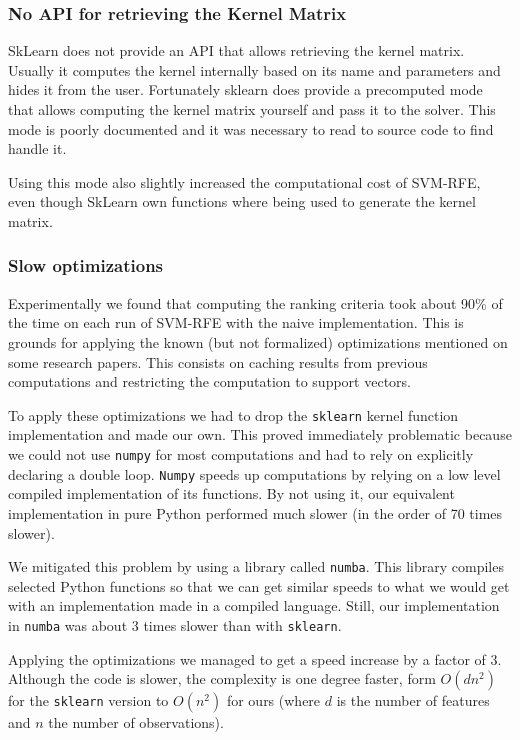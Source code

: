 \subsubsection*{No API for retrieving the Kernel Matrix}
SkLearn does not provide an API that allows retrieving the kernel matrix. Usually it computes the kernel internally based on its name and parameters and hides it from the user. Fortunately sklearn does provide a precomputed mode that allows computing the kernel matrix yourself and pass it to the solver. This mode is poorly documented and it was necessary to read to source code to find handle it.

Using this mode also slightly increased the computational cost of SVM-RFE, even though SkLearn own functions where being used to generate the kernel matrix.

\subsubsection*{Slow optimizations}
Experimentally we found that computing the ranking criteria took about 90\% of the time on each run of SVM-RFE with the naive implement\-ation. This is grounds for applying the known (but not formalized) optimizations mentioned on some research papers. This consists on caching results from previous computations and restricting the comput\-ation to support vectors.

To apply these optimizations we had to drop the \texttt{sklearn} kernel function im\-ple\-men\-ta\-tion and made our own. This proved immediately problematic because we could not use \texttt{numpy} for most computations and had to rely on explicitly declaring a double loop. \texttt{Numpy} speeds up computations by relying on a low level compiled implementation of its functions. By not using it, our equivalent implementation in pure Python performed much slower (in the order of 70 times slower).

We mitigated this problem by using a library called \texttt{numba}. This library compiles selected Python functions so that we can get similar speeds to what we would get with an implementation made in a compiled language. Still, our implementation in \texttt{numba} was about 3 times slower than with \texttt{sklearn}.

Applying the optimizations we managed to get a speed increase by a factor of 3. Although the code is slower, the complexity is one degree faster, form $O(dn^2)$ for the \texttt{sklearn} version to $O(n^2)$ for ours (where $d$ is the number of features and $n$ the number of observations).

